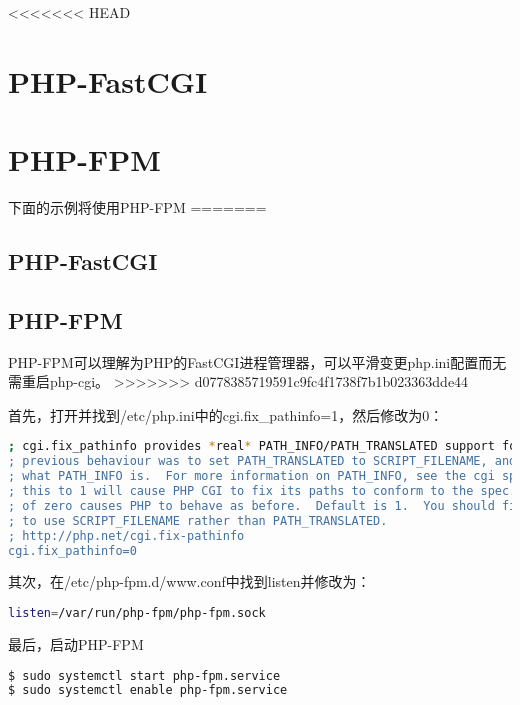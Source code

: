 <<<<<<< HEAD
\section{PHP-FastCGI}


\section{PHP-FPM}



下面的示例将使用PHP-FPM
=======
\subsection{PHP-FastCGI}


\subsection{PHP-FPM}


PHP-FPM可以理解为PHP的FastCGI进程管理器，可以平滑变更php.ini配置而无需重启php-cgi。
>>>>>>> d0778385719591c9fc4f1738f7b1b023363dde44

首先，打开并找到/etc/php.ini中的cgi.fix\_pathinfo=1，然后修改为0：


\begin{lstlisting}[language=bash]
; cgi.fix_pathinfo provides *real* PATH_INFO/PATH_TRANSLATED support for CGI.  PHP's
; previous behaviour was to set PATH_TRANSLATED to SCRIPT_FILENAME, and to not grok
; what PATH_INFO is.  For more information on PATH_INFO, see the cgi specs.  Setting
; this to 1 will cause PHP CGI to fix its paths to conform to the spec.  A setting
; of zero causes PHP to behave as before.  Default is 1.  You should fix your scripts
; to use SCRIPT_FILENAME rather than PATH_TRANSLATED.
; http://php.net/cgi.fix-pathinfo
cgi.fix_pathinfo=0
\end{lstlisting}


其次，在/etc/php-fpm.d/www.conf中找到listen并修改为：



\begin{lstlisting}[language=bash]
listen=/var/run/php-fpm/php-fpm.sock
\end{lstlisting}


最后，启动PHP-FPM



\begin{lstlisting}[language=bash]
$ sudo systemctl start php-fpm.service
$ sudo systemctl enable php-fpm.service
\end{lstlisting}


